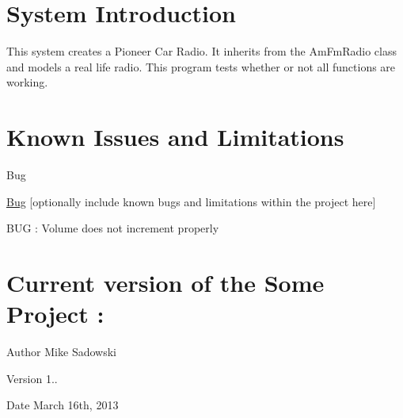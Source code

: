 \hypertarget{index_intro}{}\section{System Introduction}\label{index_intro}
This system creates a Pioneer Car Radio. It inherits from the Am\-Fm\-Radio class and models a real life radio. This program tests whether or not all functions are working.



 \hypertarget{index_knownBugs}{}\section{Known Issues and Limitations}\label{index_knownBugs}
\begin{DoxyRefDesc}{Bug}
\item[\hyperlink{bug__bug000001}{Bug}]\mbox{[}optionally include known bugs and limitations within the project here\mbox{]}
\begin{DoxyItemize}
\item B\-U\-G \-: Volume does not increment properly 
\end{DoxyItemize}\end{DoxyRefDesc}




 \hypertarget{index_version}{}\section{Current version of the Some Project \-:}\label{index_version}

\begin{DoxyItemize}
\item \begin{DoxyAuthor}{Author}
Mike Sadowski 
\end{DoxyAuthor}

\item \begin{DoxyVersion}{Version}
1.. 
\end{DoxyVersion}

\item \begin{DoxyDate}{Date}
March 16th, 2013 
\end{DoxyDate}

\end{DoxyItemize}